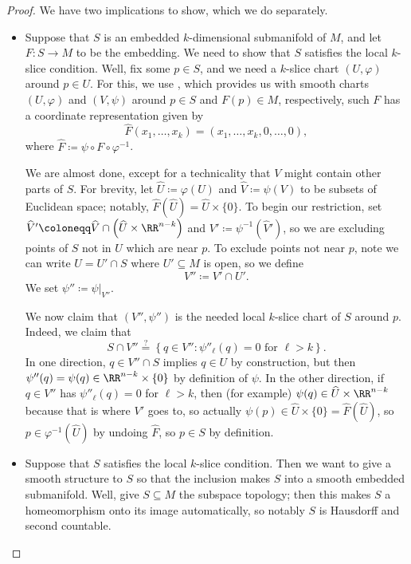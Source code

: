 \documentclass[../notes.tex]{subfiles}
\begin{document}
\begin{proof}
	We have two implications to show, which we do separately.
	\begin{itemize}
		\item Suppose that $S$ is an embedded $k$-dimensional submanifold of $M$, and let $F\colon S\to M$ to be the embedding. We need to show that $S$ satisfies the local $k$-slice condition. Well, fix some $p\in S$, and we need a $k$-slice chart $(U,\varphi)$ around $p\in U$. For this, we use , which provides us with smooth charts $(U,\varphi)$ and $(V,\psi)$ around $p\in S$ and $F(p)\in M$, respectively, such $F$ has a coordinate representation given by
		\[\widehat F(x_1,\ldots,x_k)=(x_1,\ldots,x_k,0,\ldots,0),\]
		where $\widehat F\coloneqq\psi\circ F\circ\varphi^{-1}$.
		
		We are almost done, except for a technicality that $V$ might contain other parts of $S$. For brevity, let $\widehat U\coloneqq\varphi(U)$ and $\widehat V\coloneqq\psi(V)$ to be subsets of Euclidean space; notably, $\widehat F(\widehat U)=\widehat U\times\{0\}$. To begin our restriction, set $\widehat V'\coloneqq\widehat V\cap\left(\widehat U\times\RR^{n-k}\right)$ and $V'\coloneqq\psi^{-1}(\widehat V')$, so we are excluding points of $S$ not in $U$ which are near $p$. To exclude points not near $p$, note we can write $U=U'\cap S$ where $U'\subseteq M$ is open, so we define
		\[V''\coloneqq V'\cap U'.\]
		We set $\psi''\coloneqq\psi|_{V''}$.

		We now claim that $(V'',\psi'')$ is the needed local $k$-slice chart of $S$ around $p$. Indeed, we claim that
		\[S\cap V''\stackrel?=\left\{q\in V'':\psi''_\ell(q)=0\text{ for }\ell>k\right\}.\]
		In one direction, $q\in V''\cap S$ implies $q\in U$ by construction, but then $\psi''(q)=\psi(q)\in\RR^{n-k}\times\{0\}$ by definition of $\psi$. In the other direction, if $q\in V''$ has $\psi''_\ell(q)=0$ for $\ell>k$, then (for example) $\psi(q)\in\widehat U\times\RR^{n-k}$ because that is where $V'$ goes to, so actually $\psi(p)\in\widehat U\times\{0\}=\widehat F(\widehat U)$, so $p\in\varphi^{-1}(\widehat U)$ by undoing $\widehat F$, so $p\in S$ by definition.

		\item Suppose that $S$ satisfies the local $k$-slice condition. Then we want to give a smooth structure to $S$ so that the inclusion makes $S$ into a smooth embedded submanifold. Well, give $S\subseteq M$ the subspace topology; then this makes $S$ a homeomorphism onto its image automatically, so notably $S$ is Hausdorff and second countable.


\end{itemize}
\end{proof}
\end{document}
